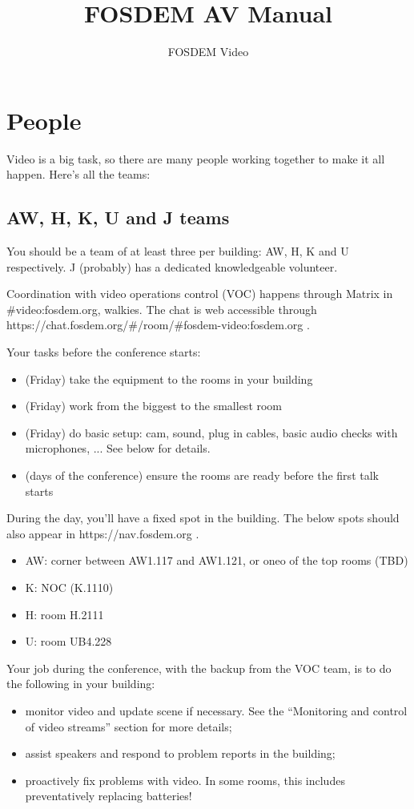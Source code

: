 \documentclass{article}
\title{FOSDEM AV Manual}
\author{FOSDEM Video}
\begin{document}
\maketitle \thispagestyle{empty}
\newpage

\tableofcontents
\newpage

\section{People}
Video is a big task, so there are many people working together to make it all happen. Here's all the teams:

\subsection{AW, H, K, U and J teams}
You should be a team of at least three per building: AW, H, K and U respectively. J (probably) has a dedicated knowledgeable volunteer.

Coordination with video operations control (VOC) happens through Matrix in \#video:fosdem.org, walkies. The chat is web accessible through https://chat.fosdem.org/\#/room/\#fosdem-video:fosdem.org .

Your tasks before the conference starts:
\begin{itemize}
  \item (Friday) take the equipment to the rooms in your building
  \item (Friday) work from the biggest to the smallest room
  \item (Friday) do basic setup: cam, sound, plug in cables, basic audio checks with microphones, ... See below for details.
  \item (days of the conference) ensure the rooms are ready before the first talk starts
\end{itemize}

During the day, you'll have a fixed spot in the building. The below spots should also appear in https://nav.fosdem.org .
\begin{itemize}
  \item AW: corner between AW1.117 and AW1.121, or oneo of the top rooms (TBD)
  \item K: NOC (K.1110)
  \item H: room H.2111
  \item U: room UB4.228
\end{itemize}

Your job during the conference, with the backup from the VOC team, is to do the following in your building:
\begin{itemize}
  \item monitor video and update scene if necessary. See the ``Monitoring and control of video streams'' section for more details;
  \item assist speakers and respond to problem reports in the building;
  \item proactively fix problems with video. In some rooms, this includes preventatively replacing batteries!
\end{itemize}
\end{document}

